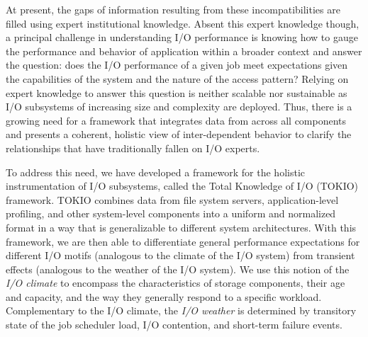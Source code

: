 At present, the gaps of information resulting from these incompatibilities are filled using expert institutional knowledge.
Absent this expert knowledge though, a principal challenge in understanding I/O performance is knowing how to gauge the performance and behavior of application within a broader context and answer the question: 
does the I/O performance of a given job meet expectations given the capabilities of the system and the nature of the access pattern?
Relying on expert knowledge to answer this question is neither scalable nor sustainable as I/O subsystems of increasing size and complexity are deployed.
Thus, there is a growing need for a framework that integrates data from across all components and presents a coherent, holistic view of inter-dependent behavior to clarify the relationships that have traditionally fallen on I/O experts.

To address this need, we have developed a framework for the holistic instrumentation of I/O subsystems, called the Total Knowledge of I/O (TOKIO) framework.
TOKIO combines data from file system servers, application-level profiling, and other system-level components into a uniform and normalized format in a way that is generalizable to different system architectures.
With this framework, we are then able to differentiate general performance expectations for different I/O motifs (analogous to the climate of the I/O system) from transient effects (analogous to the weather of the I/O system).
We use this notion of the \emph{I/O climate} to encompass the characteristics of storage components, their age and capacity, and the way they generally respond to a specific workload.
Complementary to the I/O climate, the \emph{I/O weather} is determined by transitory state of the job scheduler load, I/O contention, and short-term failure events.


